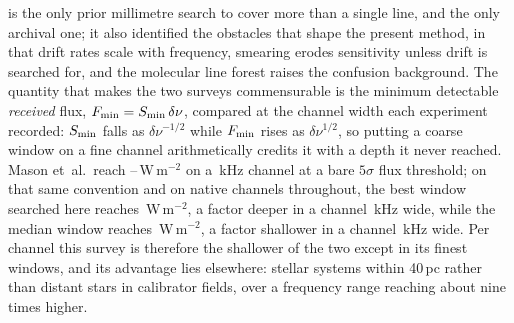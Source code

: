 \citet{Mason2025} is the only prior millimetre search to cover more than a
single line, and the only archival one; it also identified the obstacles that
shape the present method, in that drift rates scale with frequency, smearing
erodes sensitivity unless drift is searched for, and the molecular line
forest raises the confusion background. The quantity that makes the two
surveys commensurable is the minimum detectable \emph{received} flux,
$F_{\rm min}=S_{\rm min}\,\delta\nu$, compared at the channel width each
experiment recorded: $S_{\rm min}$ falls as $\delta\nu^{-1/2}$ while
$F_{\rm min}$ rises as $\delta\nu^{1/2}$, so putting a coarse window on a
fine channel arithmetically credits it with a depth it never reached. Mason
et~al.\ reach \MasonFluxLo--\MasonFluxHi\,W\,m$^{-2}$ on a
\MasonChanKHz\,kHz channel at a bare $5\sigma$ flux threshold; on that same
convention and on native channels throughout, the best window searched here
reaches \FluxTrigBest\,W\,m$^{-2}$, a factor \FluxNatBestRatio{} deeper in a
channel \FluxChanBestKHz\,kHz wide, while the median window reaches
\FluxTrigMed\,W\,m$^{-2}$, a factor \FluxNatMedRatio{} shallower in a channel
\FluxChanMedKHz\,kHz wide. Per channel this survey is therefore the shallower
of the two except in its finest windows, and its advantage lies elsewhere:
\NSysClassA{} stellar systems within 40\,pc rather than distant stars in
\MasonNCal{} calibrator fields, over a frequency range reaching about nine
times higher.

